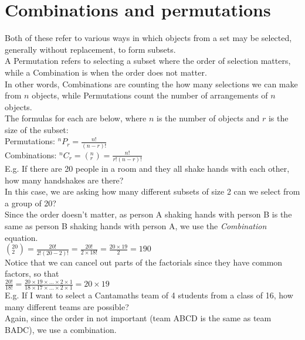 \documentclass[../main.tex]{subfiles}
\begin{document}
\section{Combinations and permutations}
Both of these refer to various ways in which objects from a set may be selected, generally without replacement, to form subsets.\\
A Permutation refers to selecting a subset where the order of selection matters, while a Combination is when the order does not matter.\\
In other words, Combinations are counting the how many selections we can make from \(n\) objects, while Permutations count the number of arrangements of \(n\) objects.\\
The formulas for each are below, where \(n\) is the number of objects and \(r\) is the size of the subset:\\

Permutations: \(^nP_r=\frac{n!}{(n-r)!}\)\\

Combinations: \(^nC_r=(_r^n)=\frac{n!}{r!(n-r)!}\)\\

\noindent E.g. If there are 20 people in a room and they all shake hands with each other, how many handshakes are there?\\
In this case, we are asking how many different subsets of size 2 can we select from a group of 20?\\
Since the order doesn't matter, as person A shaking hands with person B is the same as person B shaking hands with person A, we use the \textit{Combination} equation.\\

\((_2^{20})=\frac{20!}{2!(20-2)!}=\frac{20!}{2\times 18!}=\frac{20\times19}{2}=190\)\\

Notice that we can cancel out parts of the factorials since they have common factors, so that\\

\(\frac{20!}{18!}=\frac{20\times 19\times ... \times 2 \times 1}{18 \times 17 \times ... \times 2 \times 1} = 20 \times 19\)\\

E.g. If I want to select a Cantamaths team of 4 students from a class of 16, how many different teams are possible?\\

Again, since the order in not important (team ABCD is the same as team BADC), we use a combination.\\
\end{document}
